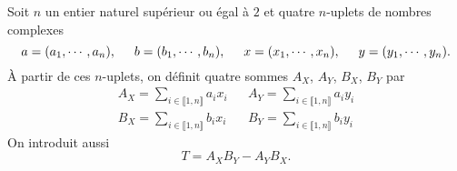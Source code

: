 Soit $n$ un entier naturel supérieur ou égal à $2$ et quatre $n$-uplets de nombres complexes
\[
 a = (a_1, \cdots, a_n),\hspace{0.5cm} b = (b_1,\cdots , b_n), \hspace{0.5cm} x = (x_1, \cdots, x_n), \hspace{0.5cm} y = (y_1,\cdots , y_n). 
\]
\`A partir de ces $n$-uplets, on définit quatre sommes $A_X$, $A_Y$, $B_X$, $B_Y$ par 
\begin{align*}
 A_X = \sum_{i \in \llbracket 1,n\rrbracket} a_i x_i & & A_Y = \sum_{i \in \llbracket 1,n\rrbracket} a_i y_i \\
 B_X = \sum_{i \in \llbracket 1,n\rrbracket} b_i x_i & &  B_Y = \sum_{i \in \llbracket 1,n\rrbracket} b_i y_i
\end{align*}
On introduit aussi 
\[
 T = A_X B_Y - A_Y B_X.
\]

